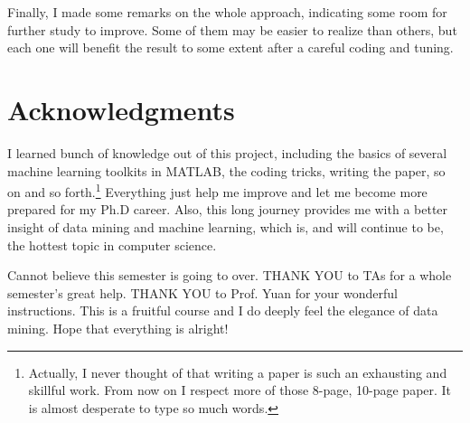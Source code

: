 \documentclass{sig-alternate}
\begin{document}
Finally, I made some remarks on the whole approach, indicating some room for further study to improve. Some of them may be easier to realize than others, but each one will benefit the result to some extent after a careful coding and tuning.

\section{Acknowledgments}
I learned bunch of knowledge out of this project, including the basics of several machine learning toolkits in MATLAB, the coding tricks, writing the paper, so on and so forth.\footnote{Actually, I never thought of that writing a paper is such an exhausting and skillful work. From now on I respect more of those 8-page, 10-page paper. It is almost desperate to type so much words.} Everything just help me improve and let me become more prepared for my Ph.D career. Also, this long journey provides me with a better insight of data mining and machine learning, which is, and will continue to be, the hottest topic in computer science.

Cannot believe this semester is going to over.  THANK YOU to TAs for a whole semester's great help. THANK YOU to Prof. Yuan for your wonderful instructions. This is a fruitful course and I do deeply feel the elegance of data mining. Hope that everything is alright!

%

%
%
\end{document}
